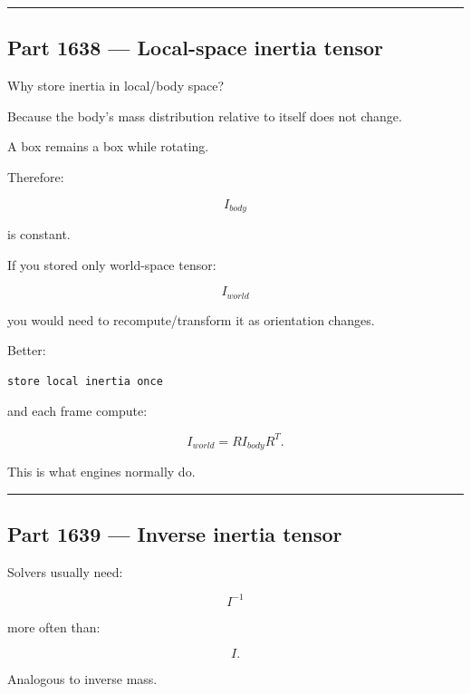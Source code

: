 \begin{center}\rule{0.5\linewidth}{0.5pt}\end{center}

\subsection{Part 1638 --- Local-space inertia tensor}\label{06-engine-ii-ch035-part-1638-local-space-inertia-tensor}

\hypertarget{06-engine-ii-ch035-part-1638-local-space-inertia-tensor}{}

Why store inertia in local/body space?

Because the body's mass distribution relative to itself does not change.

A box remains a box while rotating.

Therefore:

\[
I_{body}
\]

is constant.

If you stored only world-space tensor:

\[
I_{world}
\]

you would need to recompute/transform it as orientation changes.

Better:

\begin{verbatim}
store local inertia once
\end{verbatim}

and each frame compute:

\[
I_{world}
=
RI_{body}R^T.
\]

This is what engines normally do.

\begin{center}\rule{0.5\linewidth}{0.5pt}\end{center}

\subsection{Part 1639 --- Inverse inertia tensor}\label{06-engine-ii-ch035-part-1639-inverse-inertia-tensor}

\hypertarget{06-engine-ii-ch035-part-1639-inverse-inertia-tensor}{}

Solvers usually need:

\[
I^{-1}
\]

more often than:

\[
I.
\]

Analogous to inverse mass.

